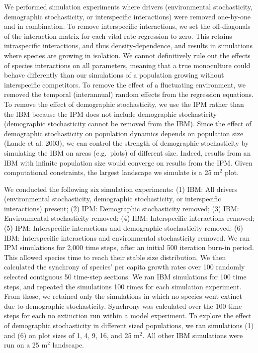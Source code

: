 \documentclass[12pt,]{article}
\begin{document}
We performed simulation experiments where drivers (environmental
stochasticity, demographic stochasticity, or interspecific interactions)
were removed one-by-one and in combination. To remove interspecific
interactions, we set the off-diagonals of the interaction matrix for
each vital rate regression to zero. This retains intraspecific
interactions, and thus density-dependence, and results in simulations
where species are growing in isolation. We cannot definitively rule out
the effects of species interactions on all parameters, meaning that a
true monoculture could behave differently than our simulations of a
population growing without interspecific competitors. To remove the
effect of a fluctuating environment, we removed the temporal
(interannual) random effects from the regression equations. To remove
the effect of demographic stochasticity, we use the IPM rather than the
IBM because the IPM does not include demographic stochasticity
(demographic stochasticity cannot be removed from the IBM). Since the
effect of demographic stochasticity on population dynamics depends on
population size (Lande et al. 2003), we can control the strength of
demographic stochasticity by simulating the IBM on areas (e.g.~plots) of
different size. Indeed, results from an IBM with infinite population
size would converge on results from the IPM. Given computational
constraints, the largest landscape we simulate is a 25 \(\text{m}^2\)
plot.

We conducted the following six simulation experiments: (1) IBM: All
drivers (environmental stochasticity, demographic stochasticity, or
interspecific interactions) present; (2) IPM: Demographic stochasticity
removed; (3) IBM: Environmental stochasticity removed; (4) IBM:
Interspecific interactions removed; (5) IPM: Interspecific interactions
and demographic stochasticity removed; (6) IBM: Interspecific
interactions and environmental stochasticity removed. We ran IPM
simulations for 2,000 time steps, after an initial 500 iteration burn-in
period. This allowed species time to reach their stable size
distribution. We then calculated the synchrony of species' per capita
growth rates over 100 randomly selected contiguous 50 time-step
sections. We ran IBM simulations for 100 time steps, and repeated the
simulations 100 times for each simulation experiment. From those, we
retained only the simulations in which no species went extinct due to
demographic stochasticity. Synchrony was calculated over the 100 time
steps for each no extinction run within a model experiment. To explore
the effect of demographic stochasticity in different sized populations,
we ran simulations (1) and (6) on plot sizes of 1, 4, 9, 16, and 25
\(\text{m}^2\). All other IBM simulations were run on a 25
\(\text{m}^2\) landscape.
\end{document}
